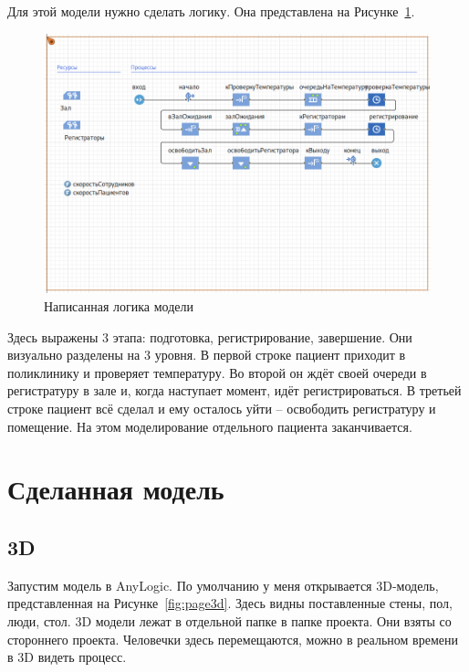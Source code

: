 \documentclass[a4paper, article]{article}
\begin{document}
    Для этой модели нужно сделать логику. Она представлена на Рисунке~\ref{fig:pageLogicSource}.

    \begin{figure}[h]
        \centering
        \includegraphics[width=0.7\linewidth]{pageLogicSource.png}
        \caption{\centering Написанная логика модели}
        \label{fig:pageLogicSource}
    \end{figure}

    Здесь выражены 3 этапа: подготовка, регистрирование, завершение. Они визуально разделены на 3 уровня. В первой строке пациент приходит в поликлинику и проверяет температуру. Во второй он ждёт своей очереди в регистратуру в зале и, когда наступает момент, идёт регистрироваться. В третьей строке пациент всё сделал и ему осталось уйти -- освободить регистратуру и помещение. На этом моделирование отдельного пациента заканчивается.

    \pagebreak

    \section{Сделанная модель}

    \subsection{3D}

    Запустим модель в AnyLogic. По умолчанию у меня открывается 3D-модель, представленная на Рисунке~\ref{fig:page3d}. Здесь видны поставленные стены, пол, люди, стол. 3D модели лежат в отдельной папке в папке проекта. Они взяты со стороннего проекта. Человечки здесь перемещаются, можно в реальном времени в 3D видеть процесс.
\end{document}
